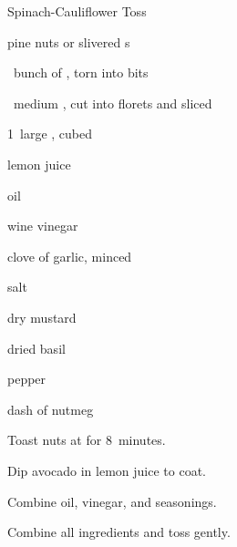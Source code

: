 \begin{recipe}{Spinach-Cauliflower Toss}{}{}

\begin{ingredients}
\item \C{\half} pine nuts or slivered s
\item \half~bunch of , torn into bits
\item \half~medium , cut into florets and sliced \inch{1\quarter}
\item 1~large , cubed
\item lemon juice
\item {} oil
\item {} wine vinegar
\item clove of garlic, minced
\item \tp{\half} salt
\item \tp{\half} dry mustard
\item \tp{\half} dried basil
\item \tp{\quarter} pepper
\item dash of nutmeg
\end{ingredients}

\begin{directions}
\item Toast nuts at  for 8~minutes.
\item Dip avocado in lemon juice to coat.
\item Combine oil, vinegar, and seasonings.
\item Combine all ingredients and toss gently.
\end{directions}

\end{recipe}

